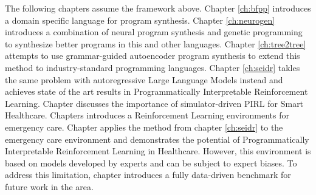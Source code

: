 The following chapters assume the framework above.
Chapter \ref{ch:bfpp} introduces a domain specific language for program synthesis. 
Chapter \ref{ch:neurogen} introduces a combination of neural program synthesis and genetic programming to synthesize better programs in this and other languages.
Chapter \ref{ch:tree2tree} attempts to use grammar-guided autoencoder program synthesis to extend this method to industry-standard programming languages.
Chapter \ref{ch:seidr} takles the same problem with autoregressive Large Language Models instead and achieves state of the art results in Programmatically Interpretable Reinforcement Learning.
Chapter \todo{} discusses the importance of simulator-driven PIRL for Smart Healthcare.
Chapters \todo{} introduces a Reinforcement Learning environments for  emergency care.
Chapter \todo{} applies the method from chapter \ref{ch:seidr} to the emergency care environment and demonstrates the potential of Programmatically Interpretable Reinforcement Learning in Healthcare.
However, this environment is based on models developed by experts and can be subject to expert biases.
To address this limitation, chapter \todo{} introduces a fully data-driven benchmark for future work in the area.